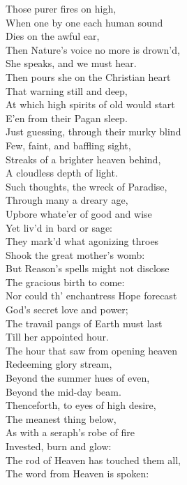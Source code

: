  Those purer fires on high, \\
  When one by one each human sound \\
 Dies on the awful ear, \\
 Then Nature’s voice no more is drown’d, \\
 She speaks, and we must hear. \\
  Then pours she on the Christian heart \\
 That warning still and deep, \\
 At which high spirits of old would start \\
 E’en from their Pagan sleep. \\
  Just guessing, through their murky blind \\
 Few, faint, and baffling sight, \\
 Streaks of a brighter heaven behind, \\
 A cloudless depth of light. \\
  Such thoughts, the wreck of Paradise, \\
 Through many a dreary age, \\
 Upbore whate’er of good and wise \\
 Yet liv’d in bard or sage: \\
  They mark’d what agonizing throes \\
 Shook the great mother’s womb: \\
 But Reason’s spells might not disclose \\
 The gracious birth to come: \\
  Nor could th’ enchantress Hope forecast \\
 God’s secret love and power; \\
 The travail pangs of Earth must last \\
 Till her appointed hour. \\
  The hour that saw from opening heaven \\
 Redeeming glory stream, \\
 Beyond the summer hues of even, \\
 Beyond the mid-day beam. \\
  Thenceforth, to eyes of high desire, \\
 The meanest thing below, \\
 As with a seraph’s robe of fire \\
 Invested, burn and glow: \\
  The rod of Heaven has touched them all, \\
 The word from Heaven is spoken: \\
